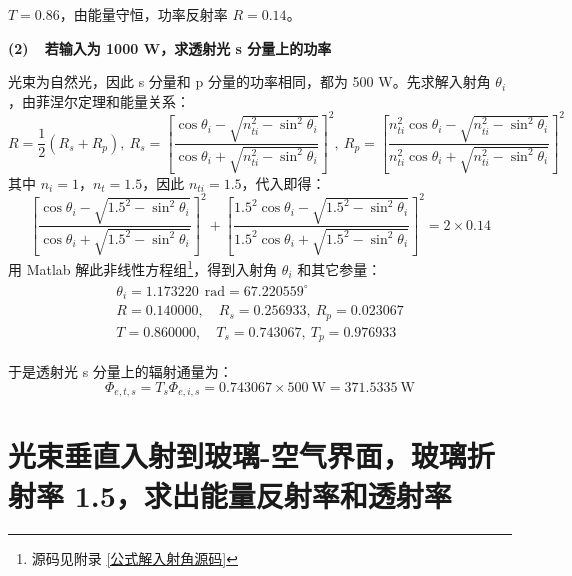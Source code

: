 \documentclass[UTF8]{report}
\theoremstyle{MyLineTheoremStyle} %
\theoremstyle{MyBlockTheoremStyle} %
\theoremstyle{MySubsubsectionStyle} %
\begin{document}
$T = 0.86$，由能量守恒，功率反射率 $R = 0.14$。

\textbf{(2)\ \ 若输入为 1000 W，求透射光 s 分量上的功率}

光束为自然光，因此 s 分量和 p 分量的功率相同，都为 500 W。先求解入射角 $\theta_i$，由菲涅尔定理和能量关系：
\begin{equation}
R =  \frac{1}{2}(R_s + R_p),\  R_s =  \left[ \frac{ \cos \theta_i - \sqrt{n_{ti}^2 - \sin^2 \theta_i} }{\cos \theta_i + \sqrt{n_{ti}^2 - \sin^2 \theta_i}} \right]^2,\ R_p = \left[ \frac{ n_{ti}^2\cos \theta_i - \sqrt{n_{ti}^2 - \sin^2 \theta_i} }{n_{ti}^2\cos \theta_i + \sqrt{n_{ti}^2 - \sin^2 \theta_i}} \right]^2
\end{equation}
其中 $n_i = 1$，$n_t = 1.5$，因此 $n_{ti} = 1.5$，代入即得：
\begin{equation}
    \left[ \frac{ \cos \theta_i - \sqrt{1.5^2 - \sin^2 \theta_i} }{\cos \theta_i + \sqrt{1.5^2 - \sin^2 \theta_i}} \right]^2 + \left[ \frac{ 1.5^2\cos \theta_i - \sqrt{1.5^2 - \sin^2 \theta_i} }{1.5^2\cos \theta_i + \sqrt{1.5^2 - \sin^2 \theta_i}} \right]^2 = 2\times0.14
\end{equation}
用 Matlab 解此非线性方程组\footnote{源码见附录 \ref{公式解入射角源码}}，得到入射角 $\theta_i$ 和其它参量：
\begin{gather}\label{解入射角}
\begin{matrix}
    \theta_i =  1.173220\ \ \mathrm{rad}  = 67.220559^\circ \\
    R = 0.140000,\quad   R_s = 0.256933,\    R_p = 0.023067 \\ 
    T = 0.860000,\quad   T_s = 0.743067,\    T_p = 0.976933
\end{matrix}
\end{gather}

于是透射光 s 分量上的辐射通量为：
\begin{equation}
\Phi_{e,t,s} = T_s \Phi_{e,i,s} = 0.743067 \times 500 \ \mathrm{W} =  371.5335 \ \mathrm{W}
\end{equation}


\section{光束垂直入射到玻璃-空气界面，玻璃折射率 1.5，求出能量反射率和透射率}
\end{document}
